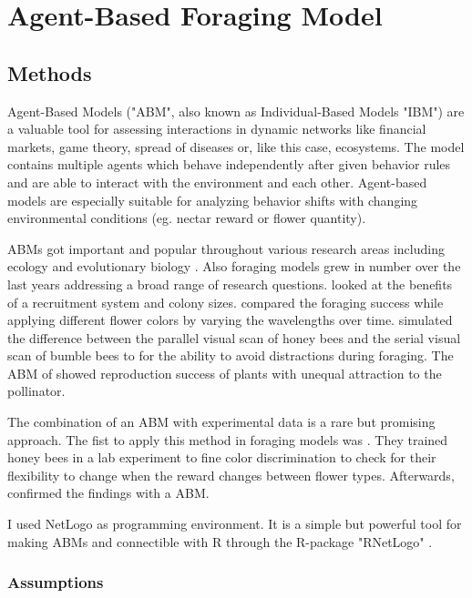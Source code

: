 
\newpage
\section{Agent-Based Foraging Model}

\subsection{Methods}
Agent-Based Models ("ABM", also known as Individual-Based Models "IBM") are a valuable tool for assessing interactions in dynamic networks like financial markets, game theory, spread of diseases or, like this case, ecosystems. The model contains multiple agents which behave independently after given behavior rules and are able to interact with the environment and each other. Agent-based models are especially suitable for analyzing behavior shifts with changing environmental conditions (eg. nectar reward or flower quantity). 

ABMs got important and popular throughout various research areas including ecology and evolutionary biology \citep{deangelis2005individual}. Also foraging models grew in number over the last years addressing a broad range of research questions. \citet{dornhaus2006benefits} looked at the benefits of a recruitment system and colony sizes. \citet{faruq2013biological} compared the foraging success while applying different flower colors by varying the wavelengths over time. \citet{bukovac2013bees} simulated the difference between the parallel visual scan of honey bees and the serial visual scan of bumble bees to for the ability to avoid distractions during foraging. The ABM of \citet{hanoteaux2013effects} showed reproduction success of plants with unequal attraction to the pollinator. 

The combination of an ABM with experimental data is a rare but promising approach. The fist to apply this method in foraging models was \citet{dyer2014bee}. They trained honey bees in a lab experiment to fine color discrimination to check for their flexibility to change when the reward changes between flower types. Afterwards, \citet{dyer2014bee} confirmed the findings with a ABM. 

I used NetLogo \citep{wilensky1999netlogo} as programming environment. It is a simple but powerful tool for making ABMs and connectible with R through the R-package "RNetLogo" \citep{thiele2014r}. 

\subsubsection*{Assumptions}

